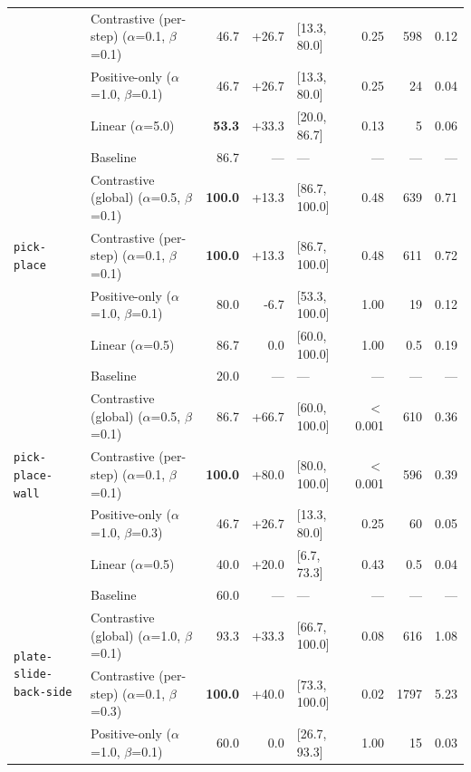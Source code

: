 \begin{table}[p]
{\begin{tabular}{@{}ll r r l r r r@{}}
   & Contrastive (per-step) \scriptsize{($\alpha$=0.1, $\beta$=0.1)} & 46.7 & +26.7 & [13.3, 80.0] & 0.25 & 598 & 0.12 \\
   & Positive-only \scriptsize{($\alpha$=1.0, $\beta$=0.1)} & 46.7 & +26.7 & [13.3, 80.0] & 0.25 & 24 & 0.04 \\
   & Linear \scriptsize{($\alpha$=5.0)} & \textbf{53.3} & +33.3 & [20.0, 86.7] & 0.13 & 5 & 0.06 \\
\midrule
  \multirow{5}{*}{\texttt{pick-place}} & Baseline & 86.7 & --- & --- & --- & --- & --- \\
   & Contrastive (global) \scriptsize{($\alpha$=0.5, $\beta$=0.1)} & \textbf{100.0} & +13.3 & [86.7, 100.0] & 0.48 & 639 & 0.71 \\
   & Contrastive (per-step) \scriptsize{($\alpha$=0.1, $\beta$=0.1)} & \textbf{100.0} & +13.3 & [86.7, 100.0] & 0.48 & 611 & 0.72 \\
   & Positive-only \scriptsize{($\alpha$=1.0, $\beta$=0.1)} & 80.0 & -6.7 & [53.3, 100.0] & 1.00 & 19 & 0.12 \\
   & Linear \scriptsize{($\alpha$=0.5)} & 86.7 & 0.0 & [60.0, 100.0] & 1.00 & 0.5 & 0.19 \\
\midrule
  \multirow{5}{*}{\texttt{pick-place-wall}} & Baseline & 20.0 & --- & --- & --- & --- & --- \\
   & Contrastive (global) \scriptsize{($\alpha$=0.5, $\beta$=0.1)} & 86.7 & +66.7 & [60.0, 100.0] & $<$0.001 & 610 & 0.36 \\
   & Contrastive (per-step) \scriptsize{($\alpha$=0.1, $\beta$=0.1)} & \textbf{100.0} & +80.0 & [80.0, 100.0] & $<$0.001 & 596 & 0.39 \\
   & Positive-only \scriptsize{($\alpha$=1.0, $\beta$=0.3)} & 46.7 & +26.7 & [13.3, 80.0] & 0.25 & 60 & 0.05 \\
   & Linear \scriptsize{($\alpha$=0.5)} & 40.0 & +20.0 & [6.7, 73.3] & 0.43 & 0.5 & 0.04 \\
\midrule
  \multirow{5}{*}{\texttt{plate-slide-back-side}} & Baseline & 60.0 & --- & --- & --- & --- & --- \\
   & Contrastive (global) \scriptsize{($\alpha$=1.0, $\beta$=0.1)} & 93.3 & +33.3 & [66.7, 100.0] & 0.08 & 616 & 1.08 \\
   & Contrastive (per-step) \scriptsize{($\alpha$=0.1, $\beta$=0.3)} & \textbf{100.0} & +40.0 & [73.3, 100.0] & 0.02 & 1797 & 5.23 \\
   & Positive-only \scriptsize{($\alpha$=1.0, $\beta$=0.1)} & 60.0 & 0.0 & [26.7, 93.3] & 1.00 & 15 & 0.03 \\

\end{tabular}}
\end{table}
